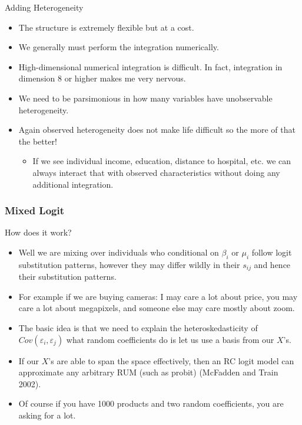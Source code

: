 \begin{frame}{Adding Heterogeneity}
\begin{itemize}
\item The structure is extremely flexible but at a cost.
\item We generally must perform the integration numerically.
\item High-dimensional numerical integration is difficult. In fact, integration in dimension 8 or higher makes me very nervous.
\item We need to be parsimonious in how many variables have unobservable heterogeneity.
\item Again observed heterogeneity does not make life difficult so the more of that the better!
\begin{itemize}
\item If we see individual income, education, distance to hospital, etc. we can always interact that with observed characteristics without doing any additional integration.
\end{itemize}
\end{itemize}
\end{frame}


\begin{frame}
\frametitle{Mixed Logit}
How does it work?
 \begin{itemize}
\item Well we are mixing over individuals who conditional on $\beta_i$ or $\mu_i$ follow logit substitution patterns, however they may differ wildly in their $s_{ij}$ and hence their substitution patterns.
\item For example if we are buying cameras: I may care a lot about price, you may care a lot about megapixels, and someone else may care mostly about zoom.
\item The basic idea is that we need to explain the heteroskedasticity of $Cov(\varepsilon_i, \varepsilon_j)$ what random coefficients do is let us use a basis from our $X$'s.
\item If our $X$'s are able to span the space effectively, then an RC logit model can approximate any arbitrary RUM (such as probit) (McFadden and Train 2002). 
\item Of course if you have 1000 products and two random coefficients, you are asking for a lot.
 \end{itemize}
\end{frame}

